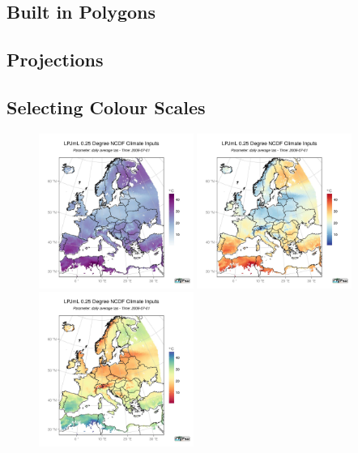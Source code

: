 \documentclass[a4paper,10pt]{article}
\begin{document}
\subsection{Built in Polygons}
\subsection{Projections}
\subsection{Selecting Colour Scales}

\begin{figure}
  \centering
   \includegraphics[width=0.45\textwidth, height=0.45\textwidth]{col1}
  \includegraphics[width=0.45\textwidth, height=0.45\textwidth]{col2}
  \includegraphics[width=0.45\textwidth, height=0.45\textwidth]{col4}

\end{figure}
\end{document}
